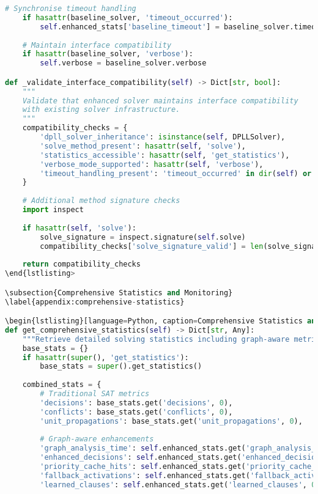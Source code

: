 \begin{lstlisting}[language=Python, caption=Integration Challenge Resolution Implementation]
    # Synchronise timeout handling
    if hasattr(baseline_solver, 'timeout_occurred'):
        self.enhanced_stats['baseline_timeout'] = baseline_solver.timeout_occurred
    
    # Maintain interface compatibility
    if hasattr(baseline_solver, 'verbose'):
        self.verbose = baseline_solver.verbose

def _validate_interface_compatibility(self) -> Dict[str, bool]:
    """
    Validate that enhanced solver maintains interface compatibility
    with existing solver infrastructure.
    """
    compatibility_checks = {
        'dpll_solver_inheritance': isinstance(self, DPLLSolver),
        'solve_method_present': hasattr(self, 'solve'),
        'statistics_accessible': hasattr(self, 'get_statistics'),
        'verbose_mode_supported': hasattr(self, 'verbose'),
        'timeout_handling_present': 'timeout_occurred' in dir(self) or hasattr(self, 'enhanced_stats')
    }
    
    # Additional method signature checks
    import inspect
    
    if hasattr(self, 'solve'):
        solve_signature = inspect.signature(self.solve)
        compatibility_checks['solve_signature_valid'] = len(solve_signature.parameters) >= 1
    
    return compatibility_checks
\end{lstlisting>

\subsection{Comprehensive Statistics and Monitoring}
\label{appendix:comprehensive-statistics}

\begin{lstlisting}[language=Python, caption=Comprehensive Statistics and Monitoring Implementation]
def get_comprehensive_statistics(self) -> Dict[str, Any]:
    """Retrieve detailed solving statistics including graph-aware metrics"""
    base_stats = {}
    if hasattr(super(), 'get_statistics'):
        base_stats = super().get_statistics()
    
    combined_stats = {
        # Traditional SAT metrics
        'decisions': base_stats.get('decisions', 0),
        'conflicts': base_stats.get('conflicts', 0),
        'unit_propagations': base_stats.get('unit_propagations', 0),
        
        # Graph-aware enhancements
        'graph_analysis_time': self.enhanced_stats.get('graph_analysis_time', 0.0),
        'enhanced_decisions': self.enhanced_stats.get('enhanced_decisions', 0),
        'priority_cache_hits': self.enhanced_stats.get('priority_cache_hits', 0),
        'fallback_activations': self.enhanced_stats.get('fallback_activations', 0),
        'learned_clauses': self.enhanced_stats.get('learned_clauses', 0),
        

\end{lstlisting}
